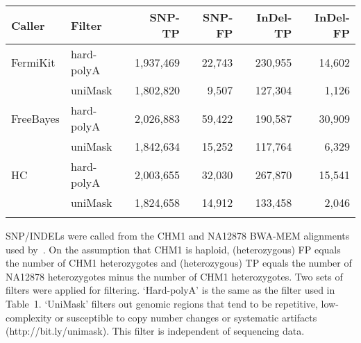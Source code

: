 \documentclass{bioinfo}
\begin{document}
\begin{table}[t]
{\footnotesize
\begin{tabular}{llrrrr}
\toprule
Caller   & Filter     & SNP-TP    & SNP-FP & InDel-TP & InDel-FP \\
\midrule
FermiKit & hard-polyA & 1,937,469 & 22,743 & 230,955 & 14,602 \\
         & uniMask    & 1,802,820 & 9,507  & 127,304 & 1,126 \\
FreeBayes& hard-polyA & 2,026,883 & 59,422 & 190,587 & 30,909 \\
         & uniMask    & 1,842,634 & 15,252 & 117,764 & 6,329 \\
HC       & hard-polyA & 2,003,655 & 32,030 & 267,870 & 15,541 \\
         & uniMask    & 1,824,658 & 14,912 & 133,458 & 2,046 \\
\botrule
\end{tabular}}{SNP/INDELs were called from the CHM1 and NA12878 BWA-MEM
alignments used by~\citet{Li:2014aa}. On the assumption that CHM1 is haploid,
(heterozygous) FP equals the number of CHM1 heterozygotes and (heterozygous) TP
equals the number of NA12878 heterozygotes minus the number of CHM1
heterozygotes. Two sets of filters were applied for filtering. `Hard-polyA' is
the same as the filter used in Table~1.  `UniMask' filters out genomic regions
that tend to be repetitive, low-complexity or susceptible to copy number
changes or systematic artifacts (http://bit.ly/unimask). This filter is
independent of sequencing data.}
\end{table}
\end{document}

